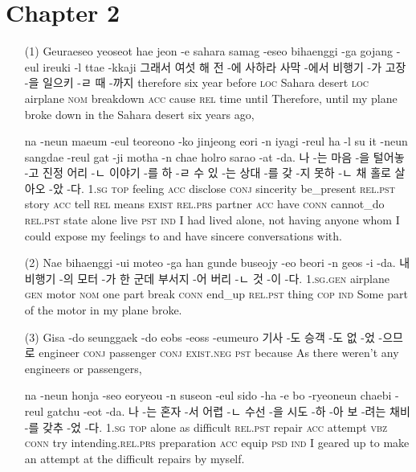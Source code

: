 \section*{Chapter 2}

\begin{itemize}
\item [(1)]
\tgl
		{Geuraeseo yeoseot hae jeon -e sahara samag -eseo bihaenggi -ga gojang -eul ireuki -l ttae -kkaji}
		{그래서 여섯 해 전 -에 사하라 사막 -에서 비행기 -가 고장 -을 일으키 -ㄹ 때 -까지}
		{therefore	six	year	before	\textsc{loc}	Sahara	desert	\textsc{loc}	airplane	\textsc{nom}	breakdown	\textsc{acc}	cause	\textsc{rel}	time	until}
		{Therefore, until my plane broke down in the Sahara desert six years ago,}
		
\tgl
		{na -neun maeum -eul teoreono -ko jinjeong eori -n iyagi -reul ha -l su it -neun sangdae -reul gat -ji motha -n chae holro sarao -at -da.}
		{나 -는 마음 -을 털어놓 -고 진정 어리 -ㄴ 이야기 -를 하 -ㄹ 수 있 -는 상대 -를 갖 -지 못하 -ㄴ 채 홀로 살아오 -았 -다.}
		{\textsc{1.sg}	\textsc{top}	feeling	\textsc{acc}	disclose	\textsc{conj}	sincerity	be\_present	\textsc{rel.pst}	story	\textsc{acc}	tell	\textsc{rel}	means	\textsc{exist}	\textsc{rel.prs}	partner	\textsc{acc}	have	\textsc{conn}	cannot\_do	\textsc{rel.pst}	state	alone	live	\textsc{pst}	\textsc{ind}}
		{I had lived alone, not having anyone whom I could expose my feelings to and have sincere conversations with.}
		
\item [(2)]
\tgl
		{Nae bihaenggi -ui moteo -ga han gunde buseojy -eo beori -n geos -i -da.}
		{내 비행기 -의 모터 -가 한 군데 부서지 -어 버리 -ㄴ 것 -이 -다.}
		{\textsc{1.sg.gen}	airplane	\textsc{gen}	motor	\textsc{nom}	one	part	break	\textsc{conn}	end\_up	\textsc{rel.pst}	thing	\textsc{cop}	\textsc{ind}}
		{Some part of the motor in my plane broke.}
		
\item [(3)]
\tgl
		{Gisa -do seunggaek -do eobs -eoss -eumeuro}
		{기사 -도 승객 -도 없 -었 -으므로}
		{engineer	\textsc{conj}	passenger	\textsc{conj}	\textsc{exist.neg}	\textsc{pst}	because}
		{As there weren't any engineers or passengers,}
		
\tgl
		{na -neun honja -seo eoryeou -n suseon -eul sido -ha -e bo -ryeoneun chaebi -reul gatchu -eot -da.}
		{나 -는 혼자 -서 어렵 -ㄴ 수선 -을 시도 -하 -아 보 -려는 채비 -를 갖추 -었 -다.}
		{\textsc{1.sg}	\textsc{top}	alone	as	difficult	\textsc{rel.pst}	repair	\textsc{acc}	attempt	\textsc{vbz}	\textsc{conn}	try	intending.\textsc{rel.prs}	preparation	\textsc{acc}	equip	\textsc{psd}	\textsc{ind}}
		{I geared up to make an attempt at the difficult repairs by myself.}
		

\end{itemize}
